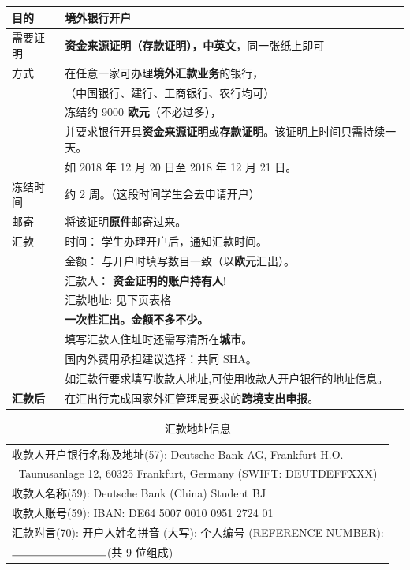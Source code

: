\documentclass[oneside,final]{book}
\begin{document}
\begin{appendices}
\begin{center}
\begin{tabular}{ll}
  \toprule
  目的 & 境外银行\textbf{开户} \\ \midrule
  需要证明 & \textbf{资金来源证明（存款证明），\color{blue}中英文}，同一张纸上即可 \\ \midrule
  方式 & 在任意一家可办理\textbf{\color{blue}境外汇款业务}的银行，\\
  & （中国银行、建行、工商银行、农行均可） \\
  & 冻结约 9000 \textbf{\color{blue}欧元}（不必过多）， \\
  & 并要求银行开具\textbf{资金来源证明}或\textbf{存款证明}。该证明上时间只需持续一天。 \\
  & 如 2018 年 12 月 20 日至 2018 年 12 月 21 日。 \\
  冻结时间 & 约 2 周。（这段时间学生会去申请开户） \\ \midrule
  邮寄 & 将该证明\textbf{原件}邮寄过来。 \\ \midrule
  汇款 & {\color{blue}时间}： 学生办理开户后，通知汇款时间。 \\
  & {\color{blue}金额}： 与开户时填写数目一致（以\textbf{\color{blue}欧元}汇出）。 \\
  & {\color{blue}汇款人}： \textbf{资金证明的账户\color{blue}持有人}! \\
  & {\color{blue}汇款地址}: 见下页表格 \\
  & \textbf{一次性汇出。金额不多不少。} \\
  & 填写汇款人住址时还需写清所在\textbf{城市}。 \\
  & 国内外费用承担建议选择：共同 SHA。 \\
  & 如汇款行要求填写收款人地址,可使用收款人开户银行的地址信息。 \\ \midrule
  \textbf{汇款后} & 在汇出行完成国家外汇管理局要求的\textbf{跨境支出申报}。 \\  
  \bottomrule
\end{tabular}
\end{center}


\begin{table}
\caption{汇款地址信息}
\label{tb:address}
\begin{center}
\begin{tabular}{l}
\toprule
收款人开户银行名称及地址(57): Deutsche Bank AG, Frankfurt H.O. \\
\multicolumn{1}{c}{Taunusanlage 12, 60325 Frankfurt, Germany
 (SWIFT: DEUTDEFFXXX)} \\
收款人名称(59): Deutsche Bank (China) Student BJ \\
收款人账号(59): IBAN: DE64 5007 0010 0951 2724 01 \\
汇款附言(70): 开户人姓名拼音 (大写): \underline{\hspace*{3cm}} 个人编号 (REFERENCE NUMBER):\\
 $\rule{3cm}{0.15mm}$(共 9 位组成) \\ \bottomrule
\end{tabular}
\end{center}
\end{table}


\end{appendices}
\end{document}
